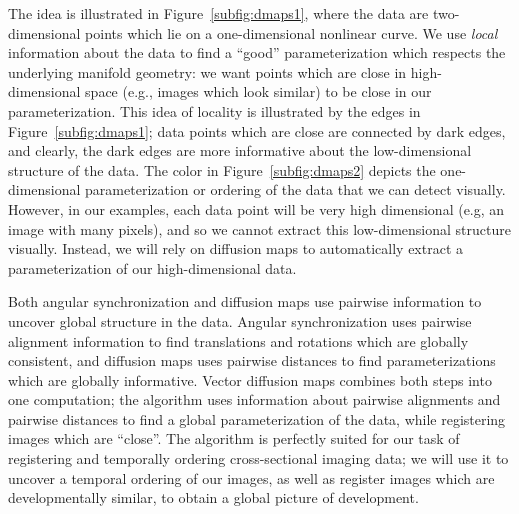 \documentclass{pnastwo}
\begin{document}
\begin{article}
The idea is illustrated in Figure~\ref{subfig:dmaps1}, where the data are two-dimensional points which lie on a one-dimensional nonlinear curve. 
%
We use {\it local} information about the data to find a ``good'' parameterization which respects the underlying manifold geometry: we want points which are close in high-dimensional space (e.g., images which look similar) to be close in our parameterization.
%
This idea of locality is illustrated by the edges in Figure~\ref{subfig:dmaps1}; data points which are close are connected by dark edges, and clearly, the dark edges are more informative about the low-dimensional structure of the data. 
%
The color in Figure~\ref{subfig:dmaps2} depicts the one-dimensional parameterization or ordering of the data that we can detect visually.
%
However, in our examples, each data point will be very high dimensional (e.g, an image with many pixels), and so we cannot extract this low-dimensional structure visually.
%
Instead, we will rely on diffusion maps to automatically extract a parameterization of our high-dimensional data.
%

Both angular synchronization and diffusion maps use pairwise information to uncover global structure in the data.
%
Angular synchronization uses pairwise alignment information to find translations and rotations which are globally consistent, and diffusion maps uses pairwise distances to find parameterizations which are globally informative.
%
Vector diffusion maps combines both steps into one computation;
the algorithm uses information about pairwise alignments and pairwise distances to find a global parameterization of the data, while registering images which are ``close''.
%
The algorithm is perfectly suited for our task of registering and temporally ordering cross-sectional imaging data; we will use it to uncover a temporal ordering of our images, as well as register images which are developmentally similar, to obtain a global picture of development.


\end{article}
\end{document}
